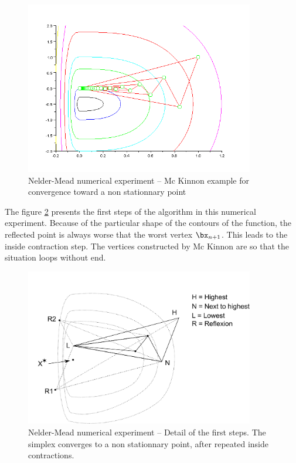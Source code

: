 \begin{figure}
\begin{center}
\includegraphics[width=10cm]{neldermeadmethod/mckinnon-history-simplex.png}
\end{center}
\caption{Nelder-Mead numerical experiment -- Mc Kinnon example for convergence toward
a non stationnary point}
\label{fig-nm-numexp-mckinnon}
\end{figure}

The figure \ref{fig-nm-numexp-mckinnon-detail} presents the first steps 
of the algorithm in this numerical experiment. Because of the 
particular shape of the contours of the function, the reflected 
point is always worse that the worst vertex $\bx_{n+1}$. This 
leads to the inside contraction step. The vertices constructed 
by Mc Kinnon are so that the situation loops without end.

\begin{figure}
\begin{center}
\includegraphics[width=10cm]{neldermeadmethod/mcKinnon-insidecontraction.pdf}
\end{center}
\caption{Nelder-Mead numerical experiment -- Detail of the first steps.
The simplex converges to a non stationnary point, after repeated 
inside contractions.}
\label{fig-nm-numexp-mckinnon-detail}
\end{figure}

